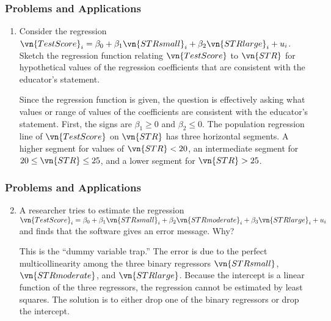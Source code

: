 \begin{frame}
\frametitle{Problems and Applications}

\begin{enumerate}\setcounter{enumi}{0}

\item Consider the regression $\vn{TestScore}_{i}=\beta_{0}+\beta_{1}\vn{STRsmall}_{i}+\beta_{2}\vn{STRlarge}_{i}+u_{i}$. Sketch the regression function relating $\vn{TestScore}$ to $\vn{STR}$ for hypothetical values of the regression coefficients that are consistent with the educator's statement.

\begin{answer}
Since the regression function is given, the question is effectively asking what values or range of values of the coefficients are consistent with the educator's statement. First, the signs are $\beta_{1}\geq0$ and $\beta_{2}\leq0$. The population regression line of $\vn{TestScore}$ on $\vn{STR}$ has three horizontal segments. A higher segment for values of $\vn{STR}<20$, an intermediate segment for $20 \leq \vn{STR} \leq 25$, and a lower segment for $\vn{STR}>25$.
\end{answer}

\end{enumerate}

\end{frame}


\begin{frame}
\frametitle{Problems and Applications}

\begin{enumerate}\setcounter{enumi}{1}

\item A researcher tries to estimate the regression $\vn{TestScore}_{i}=\beta_{0}+\beta_{1}\vn{STRsmall}_{i}+\beta_{2}\vn{STRmoderate}_{i}+\beta_{3}\vn{STRlarge}_{i}+u_{i}$ and finds that the software gives an error message. Why?

\begin{answer}
This is the ``dummy variable trap.'' The error is due to the perfect multicollinearity among the three binary regressors $\vn{STRsmall}$, $\vn{STRmoderate}$, and $\vn{STRlarge}$. Because the intercept is a linear function of the three regressors, the regression cannot be estimated by least squares. The solution is to either drop one of the binary regressors or drop the intercept. 
\end{answer}

\end{enumerate}

\end{frame}



